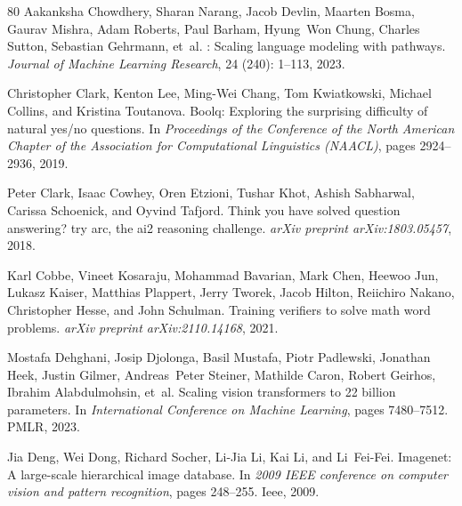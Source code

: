 \documentclass[10pt,twocolumn,letterpaper]{article}
\theoremstyle{plain}
\theoremstyle{definition}
\theoremstyle{remark}
\begin{document}
{\begin{thebibliography}{80}
Aakanksha Chowdhery, Sharan Narang, Jacob Devlin, Maarten Bosma, Gaurav Mishra,
  Adam Roberts, Paul Barham, Hyung~Won Chung, Charles Sutton, Sebastian
  Gehrmann, et~al.
: Scaling language modeling with pathways.
\newblock \emph{Journal of Machine Learning Research}, 24
  (240): 1--113, 2023.

Christopher Clark, Kenton Lee, Ming-Wei Chang, Tom Kwiatkowski, Michael
  Collins, and Kristina Toutanova.
\newblock Boolq: Exploring the surprising difficulty of natural yes/no
  questions.
\newblock In \emph{Proceedings of the Conference of the North American Chapter
  of the Association for Computational Linguistics (NAACL)}, pages 2924--2936,
  2019.

Peter Clark, Isaac Cowhey, Oren Etzioni, Tushar Khot, Ashish Sabharwal, Carissa
  Schoenick, and Oyvind Tafjord.
\newblock Think you have solved question answering? try arc, the ai2 reasoning
  challenge.
\newblock \emph{arXiv preprint arXiv:1803.05457}, 2018.

Karl Cobbe, Vineet Kosaraju, Mohammad Bavarian, Mark Chen, Heewoo Jun, Lukasz
  Kaiser, Matthias Plappert, Jerry Tworek, Jacob Hilton, Reiichiro Nakano,
  Christopher Hesse, and John Schulman.
\newblock Training verifiers to solve math word problems.
\newblock \emph{arXiv preprint arXiv:2110.14168}, 2021.

Mostafa Dehghani, Josip Djolonga, Basil Mustafa, Piotr Padlewski, Jonathan
  Heek, Justin Gilmer, Andreas~Peter Steiner, Mathilde Caron, Robert Geirhos,
  Ibrahim Alabdulmohsin, et~al.
\newblock Scaling vision transformers to 22 billion parameters.
\newblock In \emph{International Conference on Machine Learning}, pages
  7480--7512. PMLR, 2023.

Jia Deng, Wei Dong, Richard Socher, Li-Jia Li, Kai Li, and Li~Fei-Fei.
\newblock Imagenet: A large-scale hierarchical image database.
\newblock In \emph{2009 IEEE conference on computer vision and pattern
  recognition}, pages 248--255. Ieee, 2009.


\end{thebibliography}}
\end{document}
